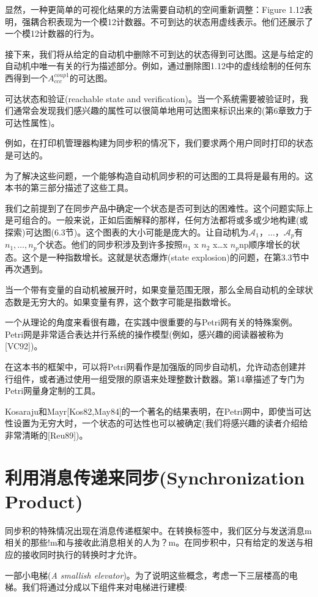 \documentclass{book}
\begin{document}
    显然，一种更简单的可视化结果的方法需要自动机的空间重新调整：Figure 1.12表明，强耦合积表现为一个模12计数器。不可到达的状态用虚线表示。他们还展示了一个模12计数器的行为。

    接下来，我们将从给定的自动机中删除不可到达的状态得到可达图。这是与给定的自动机中唯一有关的行为描述部分。例如，通过删除图1.12中的虚线绘制的任何东西得到一个$A_{ccc}^{coup1}$的可达图。

    可达状态和验证(reachable state and verification)。当一个系统需要被验证时，我们通常会发现我们感兴趣的属性可以很简单地用可达图来标识出来的(第6章致力于可达性属性)。

    例如，在打印机管理器构建为同步积的情况下，我们要求两个用户同时打印的状态是可达的。

    为了解决这些问题，一个能够构造自动机同步积的可达图的工具将是最有用的。这本书的第三部分描述了这些工具。

    我们之前提到了在同步产品中确定一个状态是否可到达的困难性。这个问题实际上是可组合的。一般来说，正如后面解释的那样，任何方法都将或多或少地构建(或探索)可达图(6.3节)。这个图表的大小可能是庞大的。让自动机为$\mathcal{A}_1，…，\mathcal{A}_p$有$n_1,…,n_p$个状态。他们的同步积涉及到许多按照$n_1$ x $n_2$ x…x $n_p$np顺序增长的状态。这个是一种指数增长。这就是状态爆炸(state explosion)的问题，在第3.3节中再次遇到。

    当一个带有变量的自动机被展开时，如果变量范围无限，那么全局自动机的全球状态数是无穷大的。如果变量有界，这个数字可能是指数增长。

    一个从理论的角度来看很有趣，在实践中很重要的与Petri网有关的特殊案例。Petri网是非常适合表达并行系统的操作模型(例如，感兴趣的阅读器被称为[VC92])。

    在这本书的框架中，可以将Petri网看作是加强版的同步自动机，允许动态创建并行组件，或者通过使用一组受限的原语来处理整数计数器。第14章描述了专门为Petri网量身定制的工具。

    Kosaraju和Mayr[Kos82,May84]的一个著名的结果表明，在Petri网中，即使当可达性设置为无穷大时，一个状态的可达性也可以被确定(我们将感兴趣的读者介绍给非常清晰的[Reu89])。

    \section{利用消息传递来同步(Synchronization Product)}
    同步积的特殊情况出现在消息传递框架中。在转换标签中，我们区分与发送消息m相关的那些!m和与接收此消息相关的人为？m。在同步积中，只有给定的发送与相应的接收同时执行的转换时才允许。

    一部小电梯({\itshape A smallish elevator})。为了说明这些概念，考虑一下三层楼高的电梯。我们将通过分成以下组件来对电梯进行建模:
\end{document}
